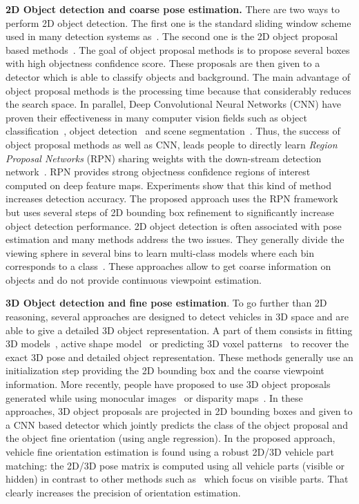 \documentclass[10pt,twocolumn,letterpaper]{article}
\begin{document}
\textbf{2D Object detection and coarse pose estimation.} There are two ways to perform 2D object detection. The first one is the standard sliding window scheme used in many detection systems as~\cite{Felzenszwalb10,overfeat}. The second one is the 2D object proposal based methods~\cite{rcnn,fast,Uijlings13,Carreira10constrainedparametric,APBMM2014}. The goal of object proposal methods is to propose several boxes with high objectness confidence score. These proposals are then given to a detector which is able to classify objects and background. The main advantage of object proposal methods is the processing time because that considerably reduces the search space. In parallel, Deep Convolutional Neural Networks (CNN) have proven their effectiveness in many computer vision fields such as object classification~\cite{gn, resnet,bird,Ranzato}, object detection~\cite{rcnn,fast,faster} and scene segmentation~\cite{seg1,seg2}. Thus, the success of object proposal methods as well as CNN, leads people to directly learn \textit{Region Proposal Networks} (RPN) sharing weights with the down-stream detection network~\cite{faster,sdp, subcnn, hypernet}. RPN provides strong objectness confidence regions of interest computed on deep feature maps. Experiments show that this kind of method increases detection accuracy. The proposed approach uses the RPN framework but uses several steps of 2D bounding box refinement to significantly increase object detection performance.
2D object detection is often associated with pose estimation and many methods address the two issues. They generally divide the viewing sphere in several bins to learn multi-class models where each bin corresponds to a class~\cite{Savarese, Savarese2, Lepetit, Schmid, Pepik}. These approaches allow to get coarse information on objects and do not provide continuous viewpoint estimation. 

\textbf{3D Object detection and fine pose estimation}. To go further than 2D reasoning, several approaches are designed to detect vehicles in 3D space and are able to give a detailed 3D object representation. A part of them consists in fitting 3D models~\cite{Ikea,Pepik2, Aubry, Lim}, active shape model~\cite{Zia1,Zia2,Zia3,eccv14_fit,Savarese3} or predicting 3D voxel patterns~\cite{3dvp} to recover the exact 3D pose and detailed object representation. These methods generally use an initialization step providing the 2D bounding box and the coarse viewpoint information. More recently, people have proposed to use 3D object proposals generated while using monocular images~\cite{mono3d} or disparity maps~\cite{3dop}. In these approaches, 3D object proposals are projected in 2D bounding boxes and given to a CNN based detector which jointly predicts the class of the object proposal and the object fine orientation (using angle regression). In the proposed approach, vehicle fine orientation estimation is found using a robust 2D/3D vehicle part matching: the 2D/3D pose matrix is computed using all vehicle parts (visible or hidden) in contrast to other methods such as~\cite{Zia1, Zia2, Zia3, eccv14_fit} which focus on visible parts. That clearly increases the precision of orientation estimation.
\end{document}
